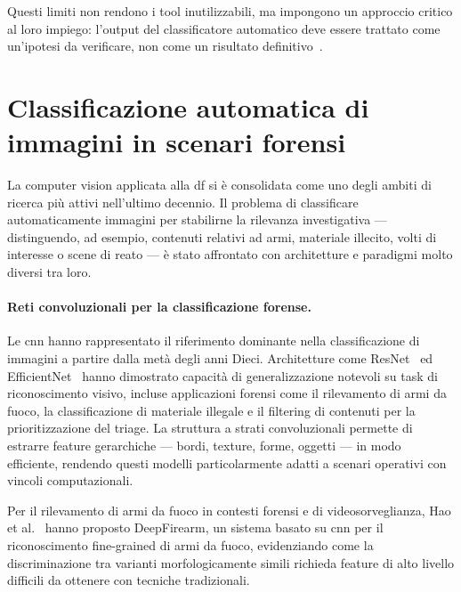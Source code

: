 Questi limiti non rendono i tool inutilizzabili, ma impongono un approccio critico al loro impiego: l'output del classificatore automatico deve essere trattato come un'ipotesi da verificare, non come un risultato definitivo~\cite{rogers2020ai, sanna2025cybercrime}.


\section{Classificazione automatica di immagini in scenari forensi}
\label{sec:image-classification}

La computer vision applicata alla \gls{df} si è consolidata come uno degli ambiti di ricerca più attivi nell'ultimo decennio. Il problema di classificare automaticamente immagini per stabilirne la rilevanza investigativa — distinguendo, ad esempio, contenuti relativi ad armi, materiale illecito, volti di interesse o scene di reato — è stato affrontato con architetture e paradigmi molto diversi tra loro.

\paragraph{Reti convoluzionali per la classificazione forense.}
Le \gls{cnn} hanno rappresentato il riferimento dominante nella classificazione di immagini a partire dalla metà degli anni Dieci. Architetture come ResNet~\cite{he2016deep} ed EfficientNet~\cite{tan2019efficientnet} hanno dimostrato capacità di generalizzazione notevoli su task di riconoscimento visivo, incluse applicazioni forensi come il rilevamento di armi da fuoco, la classificazione di materiale illegale e il filtering di contenuti per la prioritizzazione del triage. La struttura a strati convoluzionali permette di estrarre feature gerarchiche — bordi, texture, forme, oggetti — in modo efficiente, rendendo questi modelli particolarmente adatti a scenari operativi con vincoli computazionali.

Per il rilevamento di armi da fuoco in contesti forensi e di videosorveglianza, Hao et al.~\cite{Hao2018DeepFirearm} hanno proposto DeepFirearm, un sistema basato su \gls{cnn} per il riconoscimento fine-grained di armi da fuoco, evidenziando come la discriminazione tra varianti morfologicamente simili richieda feature di alto livello difficili da ottenere con tecniche tradizionali.

